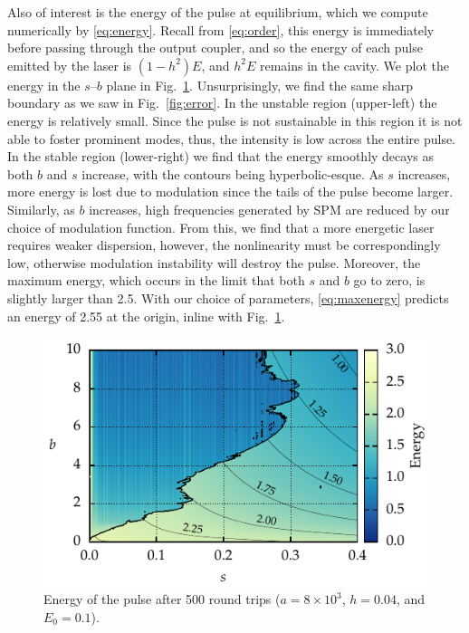 \documentclass[9pt,twocolumn,twoside]{osajnl}
\begin{document}
Also of interest is the energy of the pulse at equilibrium, which we compute numerically by \eqref{eq:energy}. Recall from \eqref{eq:order}, this energy is immediately before passing through the output coupler, and so the energy of each pulse emitted by the laser is $(1 - h^2) E$, and $h^2 E$ remains in the cavity. We plot the energy in the $s$--$b$ plane in Fig.~\ref{fig:energy}. Unsurprisingly, we find the same sharp boundary as we saw in Fig.~\ref{fig:error}. In the unstable region (upper-left) the energy is relatively small. Since the pulse is not sustainable in this region it is not able to foster prominent modes, thus, the intensity is low across the entire pulse. In the stable region (lower-right) we find that the energy smoothly decays as both $b$ and $s$ increase, with the contours being hyperbolic-esque. As $s$ increases, more energy is lost due to modulation since the tails of the pulse become larger. Similarly, as $b$ increases, high frequencies generated by SPM are reduced by our choice of modulation function. From this, we find that a more energetic laser requires weaker dispersion, however, the nonlinearity must be correspondingly low, otherwise modulation instability will destroy the pulse. Moreover, the maximum energy, which occurs in the limit that both $s$ and $b$ go to zero, is slightly larger than 2.5. With our choice of parameters, \eqref{eq:maxenergy} predicts an energy of 2.55 at the origin, inline with Fig.~\ref{fig:energy}.

\begin{figure}[tbp]
	\centering
	\includegraphics{Figures/ParamSpaceEnergy}
	\caption{Energy of the pulse after 500 round trips ($a = 8 \times 10^3$, $h = 0.04$, and $E_0 = 0.1$).}
	\label{fig:energy}
\end{figure}
\end{document}
